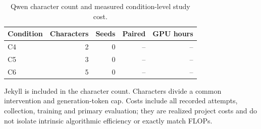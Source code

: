 \begin{table}[ht]\centering\small
\caption{Qwen character count and measured condition-level study cost.}
\begin{tabular}{lrrrr}\toprule
Condition & Characters & Seeds & Paired & GPU hours\\\midrule
C4 & 2 & 0 & -- & --\\
C5 & 3 & 0 & -- & --\\
C6 & 5 & 0 & -- & --\\
\bottomrule\end{tabular}\end{table}
Jekyll is included in the character count. Characters divide a common intervention and generation-token cap. Costs include all recorded attempts, collection, training and primary evaluation; they are realized project costs and do not isolate intrinsic algorithmic efficiency or exactly match FLOPs.
